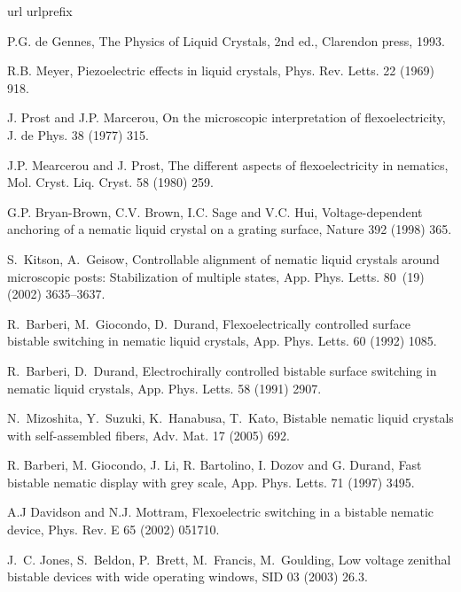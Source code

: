 \documentclass[aps,10pt,twocolumn]{revtex4}
\begin{document}
\begin{thebibliography}{10}
\expandafter\ifx\csname url\endcsname\relax
  \def\url#1{\texttt{#1}}\fi
\expandafter\ifx\csname urlprefix\endcsname\relax\def\urlprefix{URL }\fi

{P.G. de Gennes}, The Physics of Liquid Crystals, 2nd ed., Clarendon press,
  1993.

{R.B. Meyer}, Piezoelectric effects in liquid crystals, Phys. Rev. Letts. 22
  (1969) 918.

{J. Prost and J.P. Marcerou}, On the microscopic interpretation of
  flexoelectricity, J. de Phys. 38 (1977) 315.

{J.P. Mearcerou and J. Prost}, The different aspects of flexoelectricity in
  nematics, Mol. Cryst. Liq. Cryst. 58 (1980) 259.

{G.P. Bryan-Brown, C.V. Brown, I.C. Sage and V.C. Hui}, {Voltage-dependent
  anchoring of a nematic liquid crystal on a grating surface}, Nature 392
  (1998) 365.

S.~Kitson, A.~Geisow, Controllable alignment of nematic liquid crystals around
  microscopic posts: Stabilization of multiple states, App. Phys. Letts.
  80~(19) (2002) 3635--3637.

R.~Barberi, M.~Giocondo, D.~Durand, Flexoelectrically controlled surface
  bistable switching in nematic liquid crystals, App. Phys. Letts. 60 (1992)
  1085.

R.~Barberi, D.~Durand, Electrochirally controlled bistable surface switching in
  nematic liquid crystals, App. Phys. Letts. 58 (1991) 2907.

N.~Mizoshita, Y.~Suzuki, K.~Hanabusa, T.~Kato, Bistable nematic liquid crystals
  with self-assembled fibers, Adv. Mat. 17 (2005) 692.

{R. Barberi, M. Giocondo, J. Li, R. Bartolino, I. Dozov and G. Durand}, {Fast
  bistable nematic display with grey scale}, App. Phys. Letts. 71 (1997) 3495.

{A.J Davidson and N.J. Mottram}, Flexoelectric switching in a bistable nematic
  device, Phys. Rev. E 65 (2002) 051710.

J.~C. Jones, S.~Beldon, P.~Brett, M.~Francis, M.~Goulding, Low voltage zenithal
  bistable devices with wide operating windows, SID 03 (2003) 26.3.


\end{thebibliography}
\end{document}
